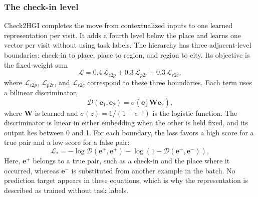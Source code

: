 \subsubsection{The check-in level}

Check2HGI completes the move from contextualized inputs to one learned representation
per visit. It adds a fourth level below the place and learns one vector per visit
without using task labels. The hierarchy has
three adjacent-level boundaries: check-in to place, place to region, and region to
city. Its objective is the fixed-weight sum
\begin{equation}\label{eq:fund:check2hgi}
    \mathcal{L} = 0.4\,\mathcal{L}_{c2p} + 0.3\,\mathcal{L}_{p2r} + 0.3\,\mathcal{L}_{r2c},
\end{equation}
where $\mathcal{L}_{c2p}$, $\mathcal{L}_{p2r}$, and $\mathcal{L}_{r2c}$ correspond
to these three boundaries. Each term uses a bilinear discriminator,
\begin{equation}\label{eq:fund:check2hgi-disc}
    \mathcal{D}(\mathbf{e}_1, \mathbf{e}_2) = \sigma(\mathbf{e}_1^{\top}\mathbf{W}\mathbf{e}_2),
\end{equation}
where $\mathbf{W}$ is learned and
$\sigma(z)=1/(1+e^{-z})$ is the logistic function. The discriminator is linear in
either embedding when the other is held fixed, and its output lies between 0 and 1.
For each boundary, the loss favors a high score for a true pair and a low score for a
false pair:
\begin{equation}\label{eq:fund:check2hgi-term}
    \mathcal{L}_{*} = -\log \mathcal{D}(\mathbf{e}^{+}, \mathbf{e}^{+})
    - \log\left(1 - \mathcal{D}(\mathbf{e}^{+}, \mathbf{e}^{-})\right),
\end{equation}
Here, $\mathbf{e}^{+}$ belongs to a true pair, such as a check-in and the place where
it occurred, whereas $\mathbf{e}^{-}$ is substituted from another example in the
batch. No prediction target appears in these equations, which is why the
representation is described as trained without task labels.

